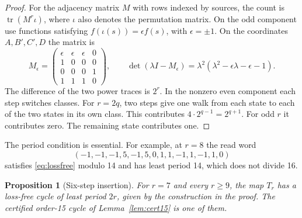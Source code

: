 \documentclass[11pt]{amsart}
\newtheorem{proposition}[theorem]{Proposition}
\theoremstyle{definition}
\DeclareMathOperator{\tr}{tr}
\begin{document}
\begin{proof}
For the adjacency matrix \(M\) with rows indexed by
sources, the count is \(\tr(M^r\iota)\), where \(\iota\) also
denotes the permutation matrix. On the odd component use
functions satisfying \(f(\iota(s))=\epsilon f(s)\), with
\(\epsilon=\pm1\). On the coordinates \(A,B',C',D\) the
matrix is
\[
 M_\epsilon=\begin{pmatrix}
 \epsilon&\epsilon&\epsilon&0\\
 1&0&0&0\\0&0&0&1\\1&1&1&0
 \end{pmatrix},
 \qquad
 \det(\lambda I-M_\epsilon)=\lambda^2
 (\lambda^2-\epsilon\lambda-\epsilon-1).
\]
The difference of the two power traces is \(2^r\).
In the nonzero even component each step switches classes.
For \(r=2q\), two steps give one walk from each state to
each of the two states in its own class. This contributes
\(4\cdot2^{q-1}=2^{q+1}\). For odd \(r\) it contributes
zero. The remaining state contributes one.
\end{proof}

The period condition is essential. For example, at \(r=8\)
the read word
\[
 (-1,-1,-1,5,-1,5,0,1,1,-1,1,-1,1,0)
\]
satisfies \eqref{eq:lossfree} modulo 14 and has least period
14, which does not divide 16.

\begin{proposition}[Six-step insertion]\label{prop:six}
For \(r=7\) and every \(r\ge9\), the map \(T_r\) has a loss-free cycle
of least period \(2r\), given by the construction in the proof. The
certified order-15 cycle of Lemma~\ref{lem:cert15} is one of them.
\end{proposition}
\end{document}
